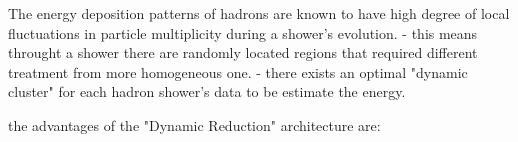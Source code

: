 The energy deposition patterns of hadrons are known to have high degree of local fluctuations in particle multiplicity during a shower's evolution.
- this means throught a shower there are randomly located regions that required different treatment from more homogeneous one.
- there exists an optimal "dynamic cluster" for each hadron shower's data to be estimate the energy. 

the advantages of the "Dynamic Reduction" architecture are:
